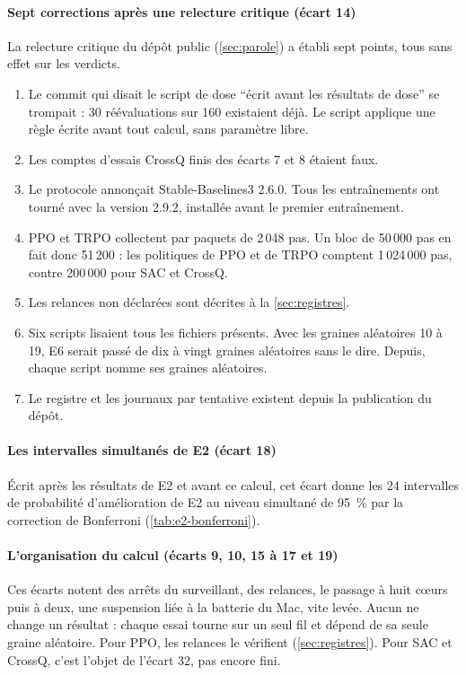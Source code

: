 \paragraph{Sept corrections après une relecture critique (écart 14)} La relecture critique du
dépôt public (\cref{sec:parole}) a établi sept points, tous sans effet sur les verdicts.
\begin{enumerate}[label=(\alph*)]
  \item Le commit qui disait le script de dose \enquote{écrit avant les résultats de dose} se
        trompait : 30 réévaluations sur 160 existaient déjà. Le script applique une règle écrite
        avant tout calcul, sans paramètre libre.
  \item Les comptes d'essais CrossQ finis des écarts 7 et 8 étaient faux.
  \item Le protocole annonçait Stable-Baselines3 2.6.0. Tous les entraînements ont tourné avec la
        version 2.9.2, installée avant le premier entraînement.
  \item PPO et TRPO collectent par paquets de 2\,048 pas. Un bloc de 50\,000 pas en fait donc
        51\,200 : les politiques de PPO et de TRPO comptent 1\,024\,000 pas, contre 200\,000 pour
        SAC et CrossQ.
  \item Les relances non déclarées sont décrites à la \cref{sec:registres}.
  \item Six scripts lisaient tous les fichiers présents. Avec les graines aléatoires 10 à 19, E6
        serait passé de dix à vingt graines aléatoires sans le dire. Depuis, chaque script nomme
        ses graines aléatoires.
  \item Le registre  et les journaux par tentative existent depuis la
        publication du dépôt.
\end{enumerate}

\paragraph{Les intervalles simultanés de E2 (écart 18)} Écrit après les
résultats de E2 et avant ce calcul, cet écart donne les 24 intervalles de probabilité
d'amélioration de E2 au niveau simultané de 95~\% par la correction de Bonferroni
(\cref{tab:e2-bonferroni}).

\paragraph{L'organisation du calcul (écarts 9, 10, 15 à 17 et 19)} Ces écarts notent des arrêts du
surveillant, des relances, le passage à huit cœurs puis à deux, une suspension liée à la batterie
du Mac, vite levée. Aucun ne change un résultat : chaque essai tourne sur un seul fil et
dépend de sa seule graine aléatoire. Pour PPO, les relances le vérifient
(\cref{sec:registres}). Pour SAC et CrossQ, c'est l'objet de l'écart 32, pas encore fini.


